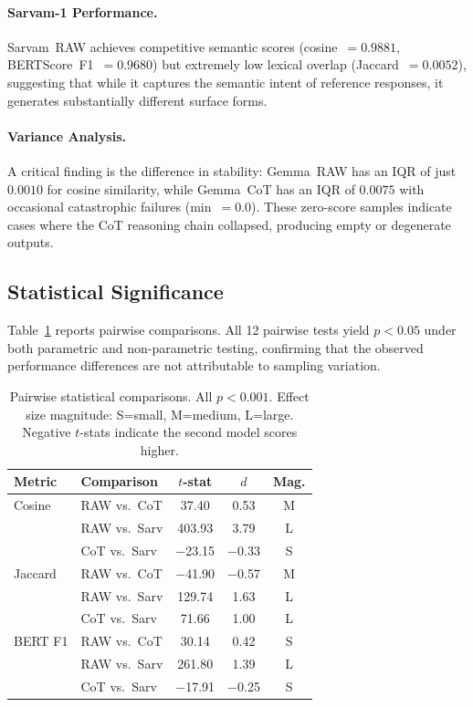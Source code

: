 \documentclass[11pt]{article}
\begin{document}
\paragraph{Sarvam-1 Performance.} Sarvam~RAW achieves competitive semantic scores (cosine~$= 0.9881$, BERTScore~F1~$= 0.9680$) but extremely low lexical overlap (Jaccard~$= 0.0052$), suggesting that while it captures the semantic intent of reference responses, it generates substantially different surface forms.

\paragraph{Variance Analysis.} A critical finding is the difference in stability: Gemma~RAW has an IQR of just $0.0010$ for cosine similarity, while Gemma~CoT has an IQR of $0.0075$ with occasional catastrophic failures (min~$= 0.0$). These zero-score samples indicate cases where the CoT reasoning chain collapsed, producing empty or degenerate outputs.

\subsection{Statistical Significance}
\label{subsec:significance}

Table~\ref{tab:significance} reports pairwise comparisons. All 12 pairwise tests yield $p < 0.05$ under both parametric and non-parametric testing, confirming that the observed performance differences are not attributable to sampling variation.

\begin{table}[t]
\centering
\small
\begin{tabular}{@{}llccc@{}}
\toprule
\textbf{Metric} & \textbf{Comparison} & \textbf{$t$-stat} & \textbf{$d$} & \textbf{Mag.} \\
\midrule
Cosine & RAW vs.\ CoT  & 37.40 & 0.53 & M \\
& RAW vs.\ Sarv & 403.93 & 3.79 & L \\
& CoT vs.\ Sarv & $-$23.15 & $-$0.33 & S \\
\midrule
Jaccard & RAW vs.\ CoT  & $-$41.90 & $-$0.57 & M \\
& RAW vs.\ Sarv & 129.74 & 1.63 & L \\
& CoT vs.\ Sarv & 71.66 & 1.00 & L \\
\midrule
BERT F1 & RAW vs.\ CoT  & 30.14 & 0.42 & S \\
& RAW vs.\ Sarv & 261.80 & 1.39 & L \\
& CoT vs.\ Sarv & $-$17.91 & $-$0.25 & S \\
\bottomrule
\end{tabular}
\caption{Pairwise statistical comparisons. All $p < 0.001$. Effect size magnitude: S=small, M=medium, L=large. Negative $t$-stats indicate the second model scores higher.}
\label{tab:significance}
\end{table}
\end{document}
